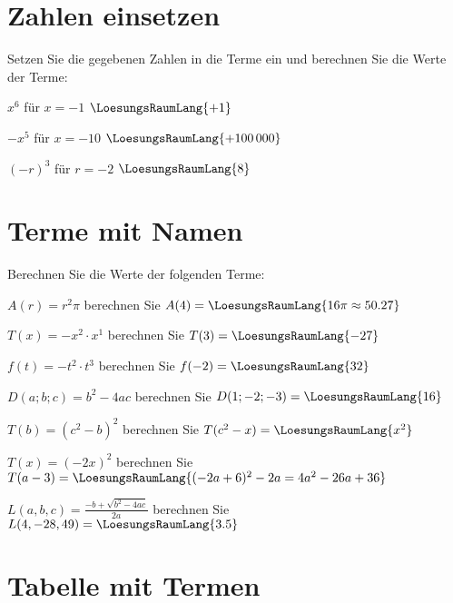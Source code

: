 \newpage


\section{Zahlen einsetzen}
Setzen Sie die gegebenen Zahlen in die Terme ein und berechnen Sie die
Werte der Terme:

\begin{bbwAufgabenBlock}
\item $x^6$ für $x=-1$ $\LoesungsRaumLang{+1}$
\item $-x^5$ für $x=-10$ $\LoesungsRaumLang{+100\,000}$
\item $(-r)^3$ für $r=-2$ $\LoesungsRaumLang{8}$
\end{bbwAufgabenBlock}
\newpage

\section{Terme mit Namen}
Berechnen Sie die Werte der folgenden Terme:

\begin{bbwAufgabenBlock}
\item $A(r)=r^2\pi$ berechnen Sie $A(4)= \LoesungsRaumLang{16\pi\approx{}50.27}$
\item $T(x)=-x^2\cdot{}x^1$ berechnen Sie $T(3)= \LoesungsRaumLang{-27}$
\item $f(t)=-t^2\cdot{}t^3$ berechnen Sie $f(-2)= \LoesungsRaumLang{32}$
\item $D(a;b;c)=b^2-4ac$ berechnen Sie $D(1;-2;-3)= \LoesungsRaumLang{16}$\newpage
\item $T(b)=(c^2-b)^2$ berechnen Sie $T(c^2-x)= \LoesungsRaumLang{x^2}$
\item $T(x)=(-2x)^2$ berechnen Sie $T(a-3)= \LoesungsRaumLang{(-2a+6)^2-2a=4a^2-26a+36}$
\item $L(a,b,c)=\frac{-b+\sqrt{b^2-4ac}}{2a}$ berechnen Sie $L(4, -28, 49)= \LoesungsRaumLang{3.5}$
\end{bbwAufgabenBlock}
\newpage%

\section{Tabelle mit Termen}
\nextBbwAufgabenNummer{}

